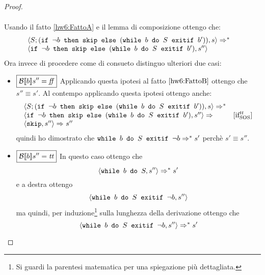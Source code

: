 \begin{enumerate}
\begin{proof}
\begin{itemize}
$$\begin{array}{ll}
\end{array}
$$
Usando il fatto \ref{hw6:FattoA}  e il lemma di composizione ottengo che:
$$
\begin{array}{ll}
\confSs{S; (\ifABC{\neg b}{\skipForFriends}{(\wbSE{b}{S}{b'})})}{s} \Rar{*} & \\
\confSs{\ifABC{\neg b}{\skipForFriends}{(\wbSE{b}{S}{b'})}}{s''}
\end{array}
$$
Ora invece di procedere come di consueto distinguo ulteriori due casi:
\begin{itemize}
\item $\boxed{\B{b}'' = \semfalse}$
Applicando questa ipotesi al fatto $\ref{hw6:FattoB}$ ottengo che $\boxed{s'' \equiv s'}$.
Al contempo applicando questa ipotesi ottengo anche:
$$
\begin{array}{ll}
	\confSs{S; (\ifABC{\neg b}{\skipForFriends}{(\wbSE{b}{S}{b'})})}{s} \Rar{*} & \\
	\confSs{\ifABC{\neg b}{\skipForFriends}{(\wbSE{b}{S}{b'})}}{s''} \Rar{} & \ifttSOS \\
	\confSs{\skipForFriends}{s''} \Rar{ } s'' & \\
\end{array}
$$
quindi ho dimostrato che $\wbSE{b}{S}{\neg b} \Rar{*} s'$ perchè $s' \equiv s''$.
\item $\boxed{\B{b}'' = \semtrue}$	
In questo caso ottengo che
$$
\confSs{\wbS{b}{S}}{s''} \Rar{*} s'
$$
e a destra ottengo
$$
\confSs{\wbSE{b}{S}{\neg b}}{s''}
$$
ma quindi, per induzione\footnote{Si guardi la parentesi matematica per una
spiegazione più dettagliata.} sulla lunghezza della derivazione ottengo che
$$
\confSs{\wbSE{b}{S}{\neg b}}{s''} \Rar{*} s'
$$
\end{itemize}
\end{itemize}
\end{proof}
\end{enumerate}

